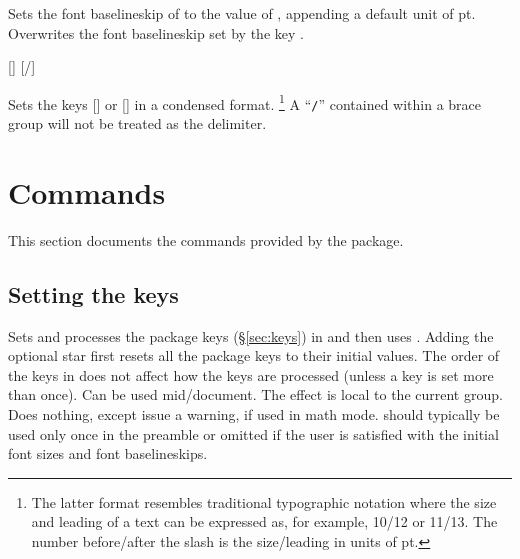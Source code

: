 \documentclass{beery}
\begin{document}
Sets the font baselineskip of  to the value of , appending a default unit of \unit{pt}.
Overwrites the font baselineskip set by the key .

\begin{mydisplaycode}
  []
  \nopagebreak\newline
  [/]
\end{mydisplaycode}

Sets the keys [] or [] in a condensed format.%
\footnote
  {%
    The latter format resembles traditional typographic notation where the size and leading of a text can be expressed as, for example, \num{10}/\num{12} or \num{11}/\num{13}.
    The number before\slash{}after the slash is the size\slash{}leading in units of \unit{pt}.%
  }
A \enquote{\texttt{/}} contained within a brace group will not be treated as the delimiter.


\section{Commands}
\label{sec:commands}

This section documents the commands provided by the  package.

\subsection{Setting the keys}
\label{subsec:fontscalesetup}

\begin{mydisplaycode}
   \sarg{} 
\end{mydisplaycode}

Sets and processes the  package keys (\S\ref{sec:keys}) in  and then uses .
Adding the optional star first resets all the  package keys to their initial values.
The order of the keys in  does not affect how the keys are processed (unless a key is set more than once).
Can be used mid\-/document.
The effect is local to the current group.
Does nothing, except issue a warning, if used in math mode.
 should typically be used only once in the preamble or omitted if the user is satisfied with the initial font sizes and font baselineskips.
\end{document}
